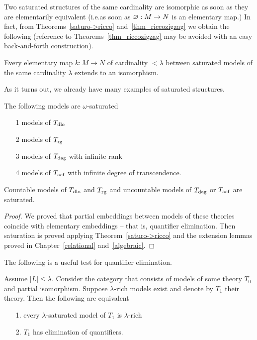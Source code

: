 Two saturated structures of the same cardinality are isomorphic as soon as they are elementarily equivalent (i.e.\@ as soon as $\varnothing:M\to N$ is an elementary map.) In fact, from Theorems~\ref{saturo->ricco} and~\ref{thm_riccozigzag} we obtain the following (reference to Theorems~\ref{thm_riccozigzag} may be avoided with an easy back-and-forth construction).

\begin{corollary}
Every elementary map $k:M\to N$ of cardinality $<\lambda$ between saturated models of the same cardinality $\lambda$ extends to an isomorphism.
\end{corollary}

As it turns out, we already have many examples of saturated structures.

\begin{corollary}
The following models are $\omega\mbox{-}$saturated
\begin{itemize}
\item[1] models of $T_{\rm dlo}$
\item[2] models of $T_{\rm rg}$
\item[3] models of $T_{\rm dag}$ with infinite rank
\item[4] models of $T_{\rm acf}$ with infinite degree of transcendence.
\end{itemize}
Countable models of $T_{\rm dlo}$ and $T_{\rm rg}$ and uncountable models of $T_{\rm dag}$ or $T_{\rm acf}$ are saturated. 
\end{corollary}
\begin{proof}
We proved that partial embeddings between models of these theories coincide with elementary embeddings -- that is, quantifier elimination.
Then saturation is proved applying Theorem~\ref{saturo->ricco} and the extension lemmas proved in Chapter~\ref{relational} and~\ref{algebraic}.
\end{proof}

The following is a useful test for quantifier elimination.

\begin{theorem}\label{thm_ricchezza_saturazione_QE}
Assume $|L|\le\lambda$. Consider the category that consists of models of some theory $T_0$ and partial isomorphism. Suppose $\lambda\mbox{-}$rich models exist and denote by $T_1$ their theory. Then the following are equivalent
\begin{itemize}
\item[1.] every $\lambda\mbox{-}$saturated model of $T_1$ is $\lambda\mbox{-}$rich
\item[2.] $T_1$ has elimination of quantifiers.
\end{itemize}
\end{theorem}

